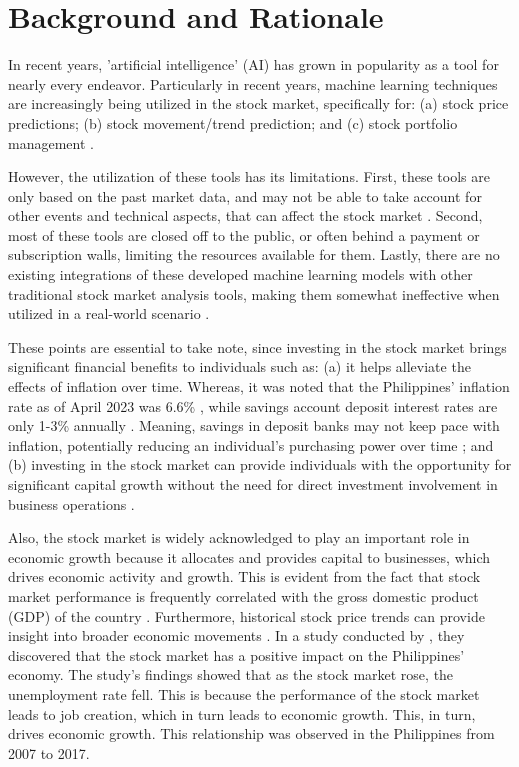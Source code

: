 \section{Background and Rationale}
\label{sec:background}
In recent years, 'artificial intelligence' (AI) has grown in popularity as a tool 
for nearly every endeavor. Particularly in recent years, machine learning techniques 
are increasingly being utilized in the stock market, specifically for: 
(a) stock price predictions; (b) stock movement/trend prediction; and 
(c) stock portfolio management
\cite{Kumbure2022, Strader2020, Soni2022, Rea2020, Guo2022, Budiharto2021}. 

However, the utilization of these tools has its limitations. First, these tools
are only based on the past market data, and may not be able to take account
for other events and technical aspects, that can affect the stock market
\cite{Concoda2020}. 
Second, most of these tools are closed off to the public, or often behind a 
payment or subscription walls, limiting the resources available for them.
Lastly, there are no existing integrations of these developed machine learning
models with other traditional stock market analysis tools, making them somewhat
ineffective when utilized in a real-world scenario
\cite{CHHAJER2022100015, zou2023stock}.

These points are essential to take note, since investing in the stock market brings 
significant financial benefits to individuals such as: 
(a) it helps alleviate the effects of inflation over time. Whereas, it was noted 
that the Philippines' inflation rate as of April 2023 was 6.6\% \cite{NEDA2023}, 
while savings account  deposit interest rates are only 1-3\% annually \cite{BSP19}. 
Meaning, savings in deposit banks may not keep pace with inflation, 
potentially reducing an individual's purchasing power over time \cite{RBC, EdwardJones}; 
and (b) investing in the stock market can provide individuals with the opportunity for 
significant capital growth without the need for direct investment involvement in 
business operations \cite{USSecAndExComm}.

Also, the stock market is widely acknowledged to play an important role in economic 
growth because it allocates and provides capital to businesses, which drives economic 
activity and growth. This is evident from the fact that stock market performance 
is frequently correlated with the gross domestic product (GDP) of the country
\cite{TradeBrains, Hall2022, Bae2017}.
Furthermore, historical stock price trends can provide insight 
into broader economic movements
\cite{Campbell2021}. 
In a study conducted by , they discovered that the stock market
has a positive impact on the Philippines' economy. The study's findings showed that
as the stock market rose, the unemployment rate fell. This is because the performance 
of the stock market leads to job creation, which in turn leads to economic growth.
This, in turn, drives economic growth. This relationship was observed
in the Philippines from 2007 to 2017.


